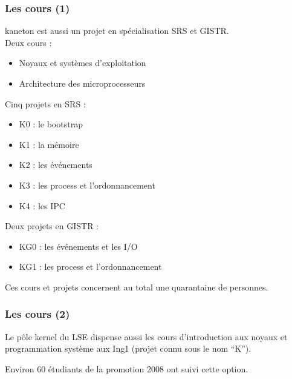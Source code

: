 \begin{frame}
  \frametitle{Les cours (1)}

  kaneton est aussi un projet en sp\'{e}cialisation SRS et GISTR.\\

  Deux cours :

  \begin{itemize}
  \item
    Noyaux et syst\`{e}mes d'exploitation
  \item
    Architecture des microprocesseurs
  \end{itemize}

  \-

  Cinq projets en SRS :

  \begin{itemize}
  \item
    K0 : le bootstrap
  \item
    K1 : la m\'{e}moire
  \item
    K2 : les \'{e}v\'{e}nements
  \item
    K3 : les process et l'ordonnancement
  \item
    K4 : les IPC
  \end{itemize}

  \-

  Deux projets en GISTR :

  \begin{itemize}
  \item
    KG0 : les \'{e}v\'{e}nements et les I/O
  \item
    KG1 : les process et l'ordonnancement
  \end{itemize}

  \-

  Ces cours et projets concernent au total une quarantaine de
  personnes.

\end{frame}



\begin{frame}
  \frametitle{Les cours (2)}

  Le p\^{o}le kernel du LSE dispense aussi les cours d'introduction
  aux noyaux et programmation syst\`{e}me aux Ing1 (projet connu sous
  le nom ``K'').

  \-

  Environ 60 \'{e}tudiants de la promotion 2008 ont suivi cette option.

\end{frame}

